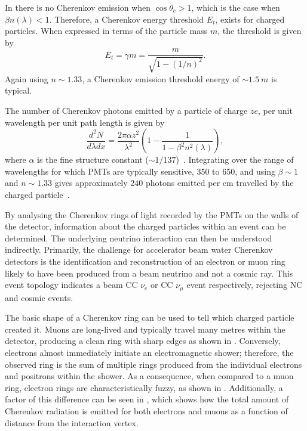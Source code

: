 In  there is no Cherenkov emission when $\cos\theta_{c} > 1$,
which is the case when $\beta n(\lambda)<1$. Therefore, a Cherenkov energy threshold $E_{t}$,
exists for charged particles. When expressed in terms of the particle mass $m$, the threshold is
given by
\begin{equation}
    E_{t} = \gamma m = \frac{m}{\sqrt{1-(1/n)^{2}}}.
    \label{eq:cherenkov_threshold}
\end{equation}
Again using $n\sim 1.33$, a Cherenkov emission threshold energy of $\sim1.5~m$ is typical.

The number of Cherenkov photons emitted by a particle of charge $ze$, per unit wavelength per unit
path length is given by
\begin{equation}
    \frac{d^{2}N}{d\lambda dx}=\frac{2\pi\alpha z^{2}}{\lambda^{2}}
    \left(1-\frac{1}{1-\beta^{2}n^{2}(\lambda)}\right),
    \label{eq:cherenkov_emission}
\end{equation}
where $\alpha$ is the fine structure constant ($\sim1/137$)~\cite{particle2020}. Integrating over
the range of wavelengths for which PMTs are typically sensitive, \SI{350}{} to
\SI{650}{}, and using $\beta\sim 1$ and $n\sim 1.33$ gives approximately $240$ photons
emitted per cm travelled by the charged particle~\cite{perch2017}.

By analysing the Cherenkov rings of light recorded by the PMTs on the walls of the detector,
information about the charged particles within an event can be determined. The underlying neutrino
interaction can then be understood indirectly. Primarily, the challenge for accelerator beam water
Cherenkov detectors is the identification and reconstruction of an electron or muon ring likely to
have been produced from a beam neutrino and not a cosmic ray. This event topology indicates a beam
CC $\nu_{e}$ or CC $\nu_{\mu}$ event respectively, rejecting NC and cosmic events.

The basic shape of a Cherenkov ring can be used to tell which charged particle created it. Muons
are long-lived and typically travel many metres within the detector, producing a clean ring with
sharp edges as shown in . Conversely, electrons almost immediately
initiate an electromagnetic shower; therefore, the observed ring is the sum of multiple rings
produced from the individual electrons and positrons within the shower. As a consequence, when
compared to a muon ring, electron rings are characteristically fuzzy, as shown in
. Additionally, a factor of this difference can be seen in
, which shows how the total amount of Cherenkov radiation is
emitted for both electrons and muons as a function of distance from the interaction vertex.

